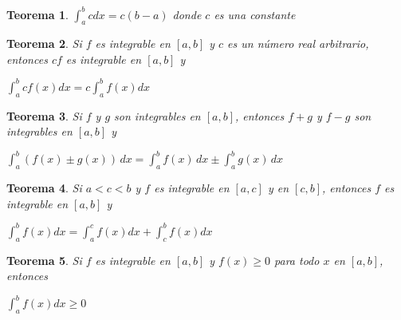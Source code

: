 \documentclass{article}
\theoremstyle{plain}
\newtheorem{theorem} {Teorema} [section]
\begin{document}
\begin{framed}
\begin{theorem}
    $\int_a^b c dx = c(b - a)$ donde $c$ es una constante
\end{theorem}
\end{framed}


\begin{framed}
\begin{theorem}
Si $f$ es integrable en $[a,b]$ y $c$ es un número real arbitrario, entonces $cf$ es integrable en $[a,b]$ y 
\begin{center}
    $\int_a^b cf(x) dx = c \int_a^b f(x) dx$
\end{center}
\end{theorem}
\end{framed}


\begin{framed}
\begin{theorem}
Si $f$ y $g$ son integrables en $[a,b]$, entonces $f+g$ y $f-g$ son integrables en $[a,b]$ y 
\begin{center}
    $\int_a^b (f(x) \pm g(x)) \, dx = \int_a^b f(x) \, dx \pm \int_a^b g(x) \, dx$
\end{center}
\end{theorem}
\end{framed}

\begin{framed}
\begin{theorem}
Si $a < c < b$ y $f$ es integrable en $[a,c]$ y en $[c,b]$, entonces $f$ es integrable en $[a,b]$ y 
\begin{center}
    $\int_a^b f(x) dx = \int_a^c f(x) dx + \int_c^b f(x) dx$
\end{center}
\end{theorem}
\end{framed}

\begin{framed}
\begin{theorem}
Si $f$ es integrable en $[a,b]$ y $f(x) \geq 0$ para todo $x$ en $[a,b]$, entonces 
\begin{center}
    $\int_a^b f(x) dx \geq 0$
\end{center}
\end{theorem}
\end{framed}
\end{document}
